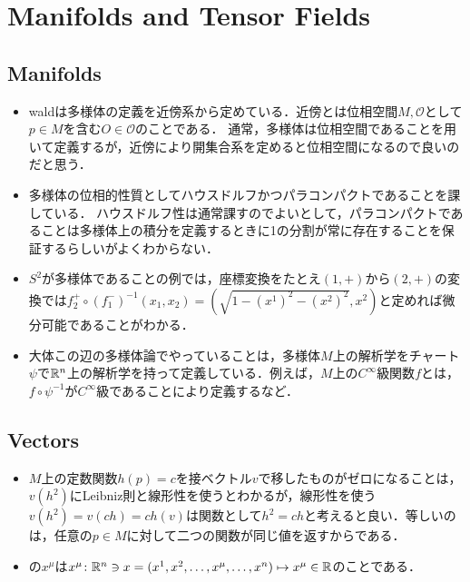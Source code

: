 \section{Manifolds and Tensor Fields}
\subsection{Manifolds}
\begin{itemize}
	\item waldは多様体の定義を近傍系から定めている．近傍とは位相空間$M, \mathcal{O}$として$p\in M$を含む$O\in \mathcal{O}$のことである．
	通常，多様体は位相空間であることを用いて定義するが，近傍により開集合系を定めると位相空間になるので良いのだと思う．
	\item 多様体の位相的性質としてハウスドルフかつパラコンパクトであることを課している．
	ハウスドルフ性は通常課すのでよいとして，パラコンパクトであることは多様体上の積分を定義するときに1の分割が常に存在することを保証するらしいがよくわからない．
	\item $S^2$が多様体であることの例では，座標変換をたとえ$(1, +)$から$(2, +)$の変換では$f_2^{+}\circ (f_1^-)^{-1}(x_1, x_2) = (\sqrt{1-(x^1)^2-(x^2)^2}, x^2)$と定めれば微分可能であることがわかる．
	\item 大体この辺の多様体論でやっていることは，多様体$M$上の解析学をチャート$\psi$で$\mathbb{R}^n$上の解析学を持って定義している．例えば，$M$上の$C^\infty$級関数$f$とは，$f\circ\psi^{-1}$が$C^\infty$級であることにより定義するなど．
\end{itemize}

\subsection{Vectors}
\begin{itemize}
	\item $M$上の定数関数$h(p) = c$を接ベクトル$v$で移したものがゼロになることは，$v(h^2)$にLeibniz則と線形性を使うとわかるが，線形性を使う$v(h^2) = v(ch) = ch(v)$は関数として$h^2 = ch$と考えると良い．等しいのは，任意の$p\in M$に対して二つの関数が同じ値を返すからである．
	\item {}の$x^{\mu}$は$x^{\mu}\colon \mathbb{R}^{n} \ni x = (x^1, x^2, \ldots, x^\mu, \ldots, x^n) \mapsto x^\mu\in\mathbb{R}$のことである．
\end{itemize}

